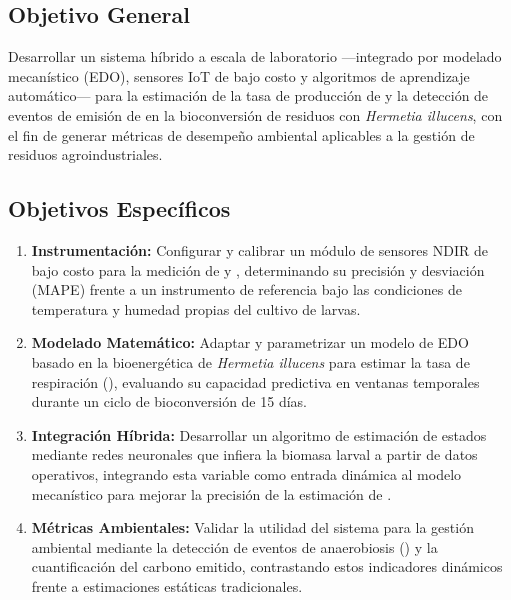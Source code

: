 \subsection{Objetivo General}

Desarrollar un sistema híbrido a escala de laboratorio —integrado por modelado mecanístico (EDO), sensores IoT de bajo costo y algoritmos de aprendizaje automático— para la estimación de la tasa de producción de  y la detección de eventos de emisión de  en la bioconversión de residuos con \textit{Hermetia illucens}, con el fin de generar métricas de desempeño ambiental aplicables a la gestión de residuos agroindustriales.

\subsection{Objetivos Específicos}

\begin{enumerate} \item \textbf{Instrumentación:} Configurar y calibrar un módulo de sensores NDIR de bajo costo para la medición de  y , determinando su precisión y desviación (MAPE) frente a un instrumento de referencia bajo las condiciones de temperatura y humedad propias del cultivo de larvas.

\item \textbf{Modelado Matemático:} Adaptar y parametrizar un modelo de EDO basado en la bioenergética de \textit{Hermetia illucens} para estimar la tasa de respiración (), evaluando su capacidad predictiva en ventanas temporales durante un ciclo de bioconversión de 15 días.

\item \textbf{Integración Híbrida:} Desarrollar un algoritmo de estimación de estados mediante redes neuronales que infiera la biomasa larval a partir de datos operativos, integrando esta variable como entrada dinámica al modelo mecanístico para mejorar la precisión de la estimación de .

\item \textbf{Métricas Ambientales:} Validar la utilidad del sistema para la gestión ambiental mediante la detección de eventos de anaerobiosis () y la cuantificación del carbono emitido, contrastando estos indicadores dinámicos frente a estimaciones estáticas tradicionales.
\end{enumerate}
